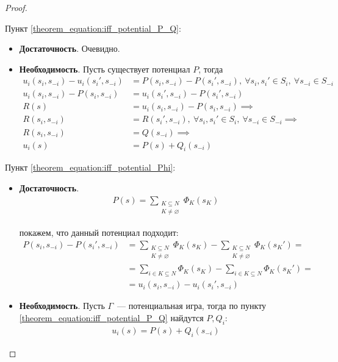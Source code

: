 \begin{proof}
	$ $

	Пункт \eqref{theorem_equation:iff_potential_P_Q}:

	\begin{itemize}
	  \item \textbf{Достаточность}. Очевидно.
	  \item \textbf{Необходимость}. Пусть существует потенциал $P$, тогда 
	  \begin{align*}
		  u_i(s_i, s_{-i}) - u_i(s_i', s_{-i}) &= P(s_i, s_{-i}) - P(s_i', s_{-i}), \ \forall s_i, s_i' \in S_i, \ \forall s_{-i} \in S_{-i} \\
		  u_i(s_i, s_{-i}) - P(s_i, s_{-i}) &= u_i(s_i', s_{-i}) - P(s_i', s_{-i})\\
		  R(s) &= u_i(s_i, s_{-i}) - P(s_i, s_{-i}) \implies \\
		  R(s_i, s_{-i}) &= R(s_i', s_{-i}), \ \forall s_i, s_i' \in S_i, \ \forall s_{-i} \in S_{-i} \implies \\
		  R(s_i, s_{-i}) &= Q(s_{-i}) \implies \\
		  u_i(s) &= P(s) + Q_i(s_{-i})
	  \end{align*}
	\end{itemize}


	Пункт \eqref{theorem_equation:iff_potential_Phi}:

	\begin{itemize}
	  \item \textbf{Достаточность}. 
	  	\begin{align*}
		P(s) = \sum_{\substack{K \subseteq N \\ K \neq \varnothing}} \Phi_K(s_K)
		\end{align*}

		покажем, что данный потенциал подходит:
	\begin{align*}
	  P(s_i, s_{-i}) - P(s_i', s_{-i}) &= \sum_{\substack{K \subseteq N \\ K \ne \varnothing}} \Phi_K(s_K) - \sum_{\substack{K \subseteq N \\ K \ne \varnothing}} \Phi_K (s_K') = \\
					       &= \sum_{i \in K \subseteq N} \Phi_K(s_K) - \sum_{i \in K \subseteq N} \Phi_K(s_K') = \\
					       &= u_i(s_i, s_{-i}) - u_i(s_i', s_{-i})
	\end{align*}

      \item \textbf{Необходимость}. Пусть $\Gamma$~--- потенциальная игра, тогда по пункту \eqref{theorem_equation:iff_potential_P_Q} найдутся $P, Q_i$:
 	 \begin{align*}
		 u_i(s) = P(s) + Q_i(s_{-i})
	\end{align*}


\end{itemize}
\end{proof}
